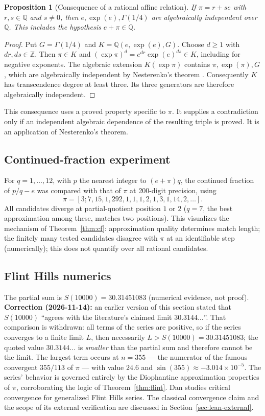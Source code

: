 \documentclass[11pt]{amsart}
\newtheorem{proposition}[theorem]{Proposition}
\theoremstyle{definition}
\theoremstyle{remark}
\numberwithin{equation}{section}
\newcommand{\Q}{\mathbb{Q}}
\newcommand{\Z}{\mathbb{Z}}
\begin{document}
\begin{proposition}[Consequence of a rational affine relation]\label{prop:nest-transfer}
If $\pi=r+se$ with $r,s\in\Q$ and $s\ne0$, then
$e,\exp(e),\Gamma(1/4)$ are algebraically independent over $\Q$.
This includes the hypothesis $e+\pi\in\Q$.
\end{proposition}
\begin{proof}
Put $G=\Gamma(1/4)$ and $K=\Q(e,\exp(e),G)$. Choose $d\ge1$ with
$dr,ds\in\Z$. Then $\pi\in K$ and
$(\exp\pi)^d=e^{dr}\exp(e)^{ds}\in K$, including for negative exponents.
The algebraic extension $K(\exp\pi)$ contains
$\pi,\exp(\pi),G$, which are algebraically independent by
Nesterenko's theorem \cite{Nesterenko1996}. Consequently $K$ has
transcendence degree at least three. Its three generators are therefore
algebraically independent.
\end{proof}
This consequence uses a proved property specific to $\pi$. It supplies a
contradiction only if an independent algebraic dependence of the resulting
triple is proved. It is an application of Nesterenko's theorem.

\subsection{Continued-fraction experiment}

For $q=1,\dots,12$, with $p$ the nearest integer to $(e+\pi)q$, the continued fraction of $p/q-e$ was compared with that of $\pi$ at 200-digit precision, using
\[
\pi=[3;7,15,1,292,1,1,1,2,1,3,1,14,2,\dots].
\] All candidates diverge at partial-quotient position $1$ or $2$ ($q=7$, the best approximation among these, matches two positions). This visualizes the mechanism of Theorem~\ref{thm:cf}: approximation quality determines match length; the finitely many tested candidates disagree with $\pi$ at an identifiable step (numerically); this does not quantify over all rational candidates.

\subsection{Flint Hills numerics}

The partial sum is $S(10000)=30.31451083$ (numerical evidence, not proof). \textbf{Correction (2026-11-14):} an earlier version of this section stated that $S(10000)$ ``agrees with the literature's claimed limit $30.3144\dots$''. That comparison is withdrawn: all terms of the series are positive, so if the series converges to a finite limit $L$, then necessarily $L>S(10000)=30.31451083$; the quoted value $30.3144\dots$ is \emph{smaller} than the partial sum and therefore cannot be the limit. The largest term occurs at $n=355$ --- the numerator of the famous convergent $355/113$ of $\pi$ --- with value $24.6$ and $\sin(355)\approx-3.014\times10^{-5}$. The series' behavior is governed entirely by the Diophantine approximation properties of $\pi$, corroborating the logic of Theorem~\ref{thm:flint}. Dan \cite{Dan2026} studies critical convergence for generalized Flint Hills series. The classical convergence claim and the scope of its external verification are discussed in Section~\ref{sec:lean-external}.
\end{document}
